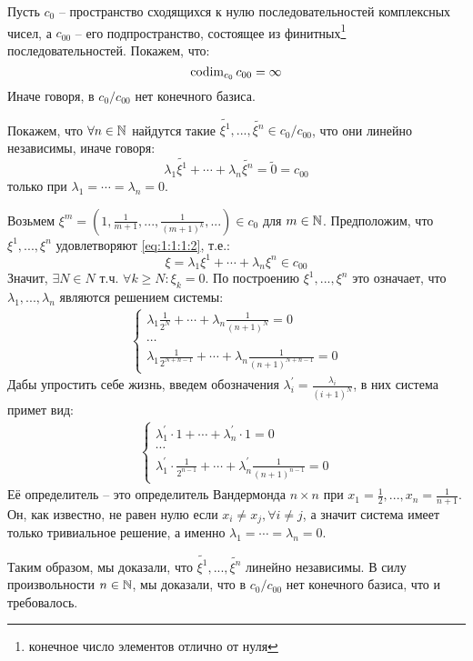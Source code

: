 \documentclass[../main.tex]{subfiles}
\begin{document}
\begin{example}
	Пусть $c_0$ -- пространство сходящихся к нулю последовательностей комплексных чисел, а $c_{00}$ -- его подпространство, состоящее из финитных\footnote{конечное число элементов отлично от нуля} последовательностей. Покажем, что:
	\begin{equation}
		\operatorname{codim}_{c_0}{c_{00}} = \infty
	\end{equation}
	Иначе говоря, в $c_0 / c_{00}$ нет конечного базиса.
	
	Покажем, что $\forall n \in \mathbb{N}$ найдутся такие $\tilde{\xi^1}, ..., \tilde{\xi^n} \in c_0 / c_{00}$, что они линейно независимы, иначе говоря:
	\begin{equation}\label{eq:1:1:1:2}
		\lambda_1 \tilde{\xi^1} + \cdots + \lambda_n \tilde{\xi^n} = \tilde{0} = c_{00}
	\end{equation}
	только при $\lambda_1 = \cdots = \lambda_n = 0$. 
	
	Возьмем $\xi^m = (1, \frac{1}{m+1}, ..., \frac{1}{(m+1)^k}, ...) \in c_0$ для $m \in \mathbb{N}$. Предположим, что $\xi^1, ..., \xi^n$ удовлетворяют \eqref{eq:1:1:1:2}, т.е.:
	$$\xi = \lambda_1 \xi^1 + \cdots + \lambda_n \xi^n \in c_{00}$$
	Значит, $\exists N \in N$ т.ч. $\forall k \geq N: \xi_k = 0$. По построению $\xi^1, ..., \xi^n$ это означает, что $\lambda_1, ..., \lambda_n$ являются решением системы:
	\begin{align*}
		\begin{cases}
			\lambda_1 \frac{1}{2^N} + \cdots + \lambda_n \frac{1}{(n + 1)^N} = 0 \\
			\cdots \\
			\lambda_1 \frac{1}{2^{N+n-1}} + \cdots + \lambda_n \frac{1}{(n + 1)^{N+n-1}} = 0
		\end{cases}
	\end{align*}
	Дабы упростить себе жизнь, введем обозначения $\lambda_i^\prime = \frac{\lambda_i}{(i+1)^N}$, в них система примет вид:
	\begin{align*}
		\begin{cases}
			\lambda_1^\prime \cdot 1 + \cdots + \lambda_n^\prime \cdot 1 = 0 \\
			\cdots \\
			\lambda_1^\prime \cdot \frac{1}{2^{n-1}} + \cdots + \lambda_n^\prime \frac{1}{(n+1)^{n-1}} = 0
		\end{cases}
	\end{align*}
	Её определитель -- это определитель Вандермонда $n \times n$ при $x_1 = \frac{1}{2}, ..., x_n = \frac{1}{n+1}$. Он, как известно, не равен нулю если $x_i \neq x_j, \forall i \neq j$, а значит система имеет только тривиальное решение, а именно $\lambda_1 = \cdots = \lambda_n = 0$.
	
	Таким образом, мы доказали, что $\tilde{\xi^1}, ..., \tilde{\xi^n}$ линейно независимы. В силу произвольности $n \in \mathbb{N}$, мы доказали, что в $c_0 / c_{00}$ нет конечного базиса, что и требовалось.
\end{example}
\end{document}
